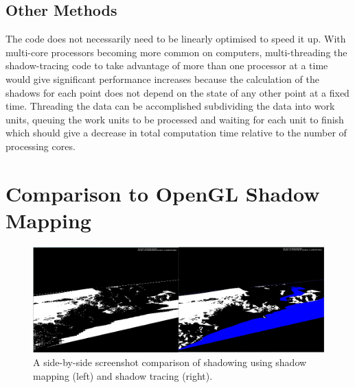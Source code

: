 \documentclass[12pt]{report}
\begin{document}
\subsection{Other Methods}
The code does not necessarily need to be linearly optimised to speed it up. With multi-core processors becoming more common on computers, multi-threading the shadow-tracing code to take advantage of more than one processor at a time would give significant performance increases because the calculation of the shadows for each point does not depend on the state of any other point at a fixed time. Threading the data can be accomplished subdividing the data into work units, queuing the work units to be processed and waiting for each unit to finish which should give a decrease in total computation time relative to the number of processing cores.

\section{Comparison to OpenGL Shadow Mapping}
\begin{figure}[h]
\centering
\includegraphics[width=\textwidth]{aggregatorvsshadowmapping.png}
\caption{A side-by-side screenshot comparison of shadowing using shadow mapping (left) and shadow tracing (right).}
\label{image:aggregatorvsshadowmapping}
\end{figure}
\end{document}
